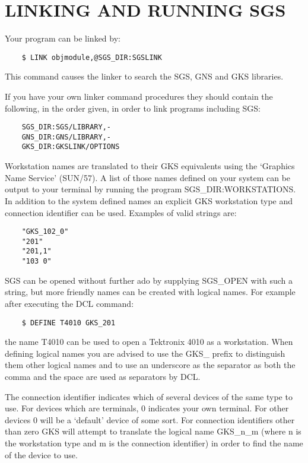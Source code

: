 \appendix
\section {LINKING AND RUNNING SGS}\label{app-linking}

Your program can be linked by:
\begin{verbatim}
    $ LINK objmodule,@SGS_DIR:SGSLINK
\end{verbatim}
This command causes the linker to search the SGS, GNS and GKS libraries.

If you have your own linker command procedures they should contain the
following, in the order given, in order to link programs including SGS:
\begin{verbatim}
    SGS_DIR:SGS/LIBRARY,-
    GNS_DIR:GNS/LIBRARY,-
    GKS_DIR:GKSLINK/OPTIONS
\end{verbatim}

Workstation names are translated to their GKS equivalents using the `Graphics
Name Service' (SUN/57). A list of those names defined on your system can be 
output to your terminal by running the program SGS\_DIR:WORKSTATIONS.
In addition to the system defined names an explicit
GKS workstation type and connection identifier can be used.
Examples of valid strings are:             
\begin{verbatim}
    "GKS_102_0"
    "201"
    "201,1"
    "103 0"
\end{verbatim}
SGS can be opened without further ado by supplying SGS\_OPEN with such a string,
but more friendly names can be created with logical names.  For example after
executing the DCL command:
\begin{verbatim}
    $ DEFINE T4010 GKS_201
\end{verbatim}
the name T4010 can be used to open a Tektronix 4010 as a workstation.
When defining logical
names you are advised to use the GKS\_ prefix to distinguish them other logical
names and to use an underscore as the separator as both the comma and the space
are used as separators by DCL.

The connection identifier indicates which of several devices of the same type
to use.  For devices which are terminals, 0 indicates your own terminal.  For
other devices 0 will be a `default' device of some sort.  For connection
identifiers other than zero GKS will attempt to translate the logical name
GKS\_n\_m (where n is the workstation type and m is the connection identifier)
in order to find the name of the device to use.


